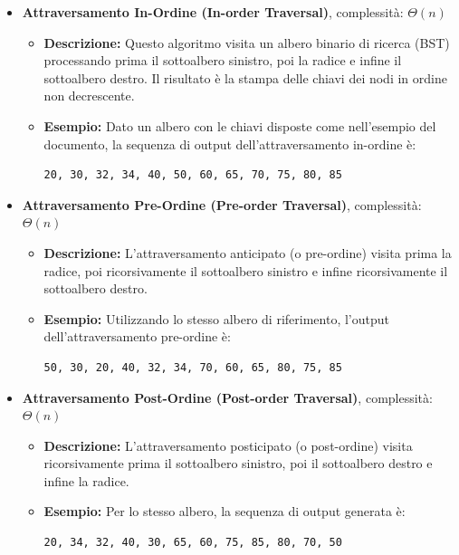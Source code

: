 \begin{itemize}
    \item \textbf{Attraversamento In-Ordine (In-order Traversal)}, complessità: $\Theta(n)$
    \begin{itemize}
        \item \textbf{Descrizione:} Questo algoritmo visita un albero binario di ricerca (BST) processando prima il sottoalbero sinistro, poi la radice e infine il sottoalbero destro. Il risultato è la stampa delle chiavi dei nodi in ordine non decrescente.

        \item \textbf{Esempio:} Dato un albero con le chiavi disposte come nell'esempio del documento, la sequenza di output dell'attraversamento in-ordine è:
        \begin{verbatim}
20, 30, 32, 34, 40, 50, 60, 65, 70, 75, 80, 85
        \end{verbatim}
    \end{itemize}

    \item \textbf{Attraversamento Pre-Ordine (Pre-order Traversal)}, complessità: $\Theta(n)$
    \begin{itemize}
        \item \textbf{Descrizione:} L'attraversamento anticipato (o pre-ordine) visita prima la radice, poi ricorsivamente il sottoalbero sinistro e infine ricorsivamente il sottoalbero destro.

        \item \textbf{Esempio:} Utilizzando lo stesso albero di riferimento, l'output dell'attraversamento pre-ordine è:
        \begin{verbatim}
50, 30, 20, 40, 32, 34, 70, 60, 65, 80, 75, 85
        \end{verbatim}
    \end{itemize}

    \item \textbf{Attraversamento Post-Ordine (Post-order Traversal)}, complessità: $\Theta(n)$
    \begin{itemize}
        \item \textbf{Descrizione:} L'attraversamento posticipato (o post-ordine) visita ricorsivamente prima il sottoalbero sinistro, poi il sottoalbero destro e infine la radice.

        \item \textbf{Esempio:} Per lo stesso albero, la sequenza di output generata è:
        \begin{verbatim}
20, 34, 32, 40, 30, 65, 60, 75, 85, 80, 70, 50
        \end{verbatim}
    \end{itemize}


\end{itemize}
